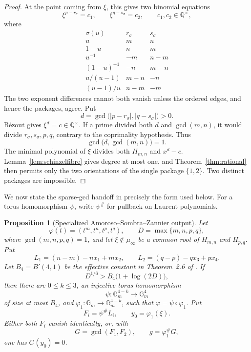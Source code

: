 \documentclass[11pt]{article}
\numberwithin{equation}{section}
\newtheorem{proposition}[theorem]{Proposition}
\theoremstyle{definition}
\newcommand{\Q}{\mathbb Q}
\begin{document}
\begin{proof}
At the point coming from \(\xi\), this gives two binomial equations
\[
 \xi^{p-r_\sigma}=c_1,
 \qquad
 \xi^{q-s_\sigma}=c_2,
 \qquad c_1,c_2\in\Q^\times,
\]
where
\[
\begin{array}{c|cc}
 \sigma(u)&r_\sigma&s_\sigma\\ \hline
 u&m&n\\
 1-u&n&m\\
 u^{-1}&-m&n-m\\
 (1-u)^{-1}&-n&m-n\\
 u/(u-1)&m-n&-n\\
 (u-1)/u&n-m&-m
\end{array}
\]
The two exponent differences cannot both vanish unless the ordered edges,
and hence the packages, agree.  Put
\[
 d=\gcd\bigl(|p-r_\sigma|,|q-s_\sigma|\bigr)>0.
\]
Bézout gives \(\xi^d=c\in\Q^\times\).  If a prime divided both \(d\)
and \(\gcd(m,n)\), it would divide \(r_\sigma,s_\sigma,p,q\), contrary
to the coprimality hypothesis.  Thus
\[
 \gcd\bigl(d,\gcd(m,n)\bigr)=1.
\]
The minimal polynomial of \(\xi\) divides both \(H_{m,n}\) and
\(x^d-c\).  Lemma~\ref{lem:schinzelfibre} gives degree at most one, and
Theorem~\ref{thm:rational} then permits only the two orientations of the
single package \(\{1,2\}\).  Two distinct packages are impossible.
\end{proof}

We now state the sparse-gcd handoff in precisely the form used below.  For a
torus homomorphism \(\psi\), write \(\psi^\#\) for pullback on Laurent
polynomials.

\begin{proposition}[Specialized Amoroso--Sombra--Zannier output]
\label{prop:aszspecial}
Let
\[
 \varphi(t)=(t^m,t^n,t^p,t^q),
 \qquad
 D=\max\{m,n,p,q\},
\]
where \(\gcd(m,n,p,q)=1\), and let \(\xi\notin\mu_\infty\) be a common
root of \(H_{m,n}\) and \(H_{p,q}\).  Put
\[
 L_1=(n-m)-nx_1+mx_2,
 \qquad
 L_2=(q-p)-qx_3+px_4.
\]
Let \(B_4=B'(4,1)\) be the effective constant in Theorem~2.6 of
\cite{AmorosoSombraZannier2017}.  If
\begin{equation}
 D^{1/6}>B_4\bigl(1+\log(2D)\bigr),
 \label{eq:17-3}
\end{equation}
then there are \(0\leq k\leq3\), an injective torus homomorphism
\[
 \psi:\mathbb G_m^{4-k}\longrightarrow\mathbb G_m^4
\]
of size at most \(B_4\), and
\(\varphi_1:\mathbb G_m\to\mathbb G_m^{4-k}\), such that
\(\varphi=\psi\circ\varphi_1\).  Put
\[
 F_i=\psi^\#L_i,
 \qquad y_0=\varphi_1(\xi).
\]
Either both \(F_i\) vanish identically, or, with
\[
 G=\gcd(F_1,F_2),
 \qquad g=\varphi_1^\#G,
\]
one has \(G(y_0)=0\).
\end{proposition}
\end{document}
